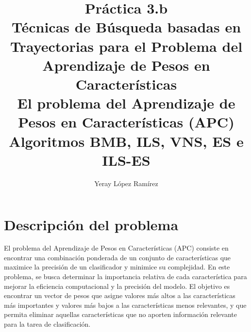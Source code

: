 

\title{
	Práctica 3.b \\\vspace{1cm}
	Técnicas de Búsqueda basadas en Trayectorias para el
	Problema del Aprendizaje de Pesos en Características
 \vspace{1cm} \\
	El problema del Aprendizaje de Pesos en Características (APC)	\vspace{1cm} \\
	Algoritmos BMB, ILS, VNS, ES e ILS-ES
	\hspace{1cm} 
 }   

\author{Yeray López Ramírez	}                             

\renewcommand*\contentsname{hola}

\makeatletter
\let\thetitle\@title
\let\theauthor\@author
\let\thedate\@date
\makeatother





\newpage %
\newcommand{\code}[1]{\colorbox{light-gray}{\textcolor{alizarin}{\texttt{#1}}}}
\newcommand{\high}[1]{\colorbox{light-gray}{\textcolor{nyellow}{\texttt{#1}}}}

\tableofcontents %

\listoffigures

\listoftables

\newpage


\section{Descripción del problema}
El problema del Aprendizaje de Pesos en Características (APC) consiste en encontrar una combinación ponderada de un conjunto de características que maximice la precisión de un clasificador y minimice su complejidad. En este problema, se busca determinar la importancia relativa de cada característica para mejorar la eficiencia computacional y la precisión del modelo. El objetivo es encontrar un vector de pesos que asigne valores más altos a las características más importantes y valores más bajos a las características menos relevantes, y que permita eliminar aquellas características que no aporten información relevante para la tarea de clasificación. \\

